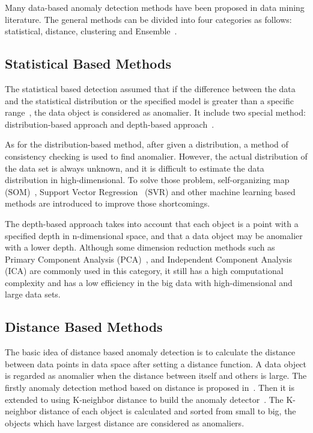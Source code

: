 Many data-based anomaly detection methods have been proposed in
data mining literature.
The general methods can be divided into four categories as follows:
statistical,
distance,
clustering and Ensemble~\cite{cook2019anomaly}.

\subsection{Statistical Based Methods}

The statistical based detection assumed that
if the difference between the data and the statistical
distribution or the specified model
is greater than a specific range~\cite{chandola2009anomaly},
the data object is considered as anomalier.
It include two special method:
distribution-based approach and
depth-based approach~\cite{wu2016survey}.

As for the distribution-based method,
after given a distribution,
a method of consistency checking is used to find anomalier.
However,
the actual distribution of the data set is always unknown,
and it is difficult to estimate the data distribution in high-dimensional.
To solve those problem,
self-organizing map (SOM)~\cite{siripanadorn2010anomaly},
Support Vector Regression~\cite{kromanis2013support} (SVR) and
other machine learning based methods are introduced to
improve those shortcomings.

The depth-based approach takes into account
that each object is a point with
a specified depth in n-dimensional space,
and that a data object may be anomalier with a lower depth.
Although some dimension reduction methods such as
Primary Component Analysis (PCA)~\cite{deng2013modified},
and Independent Component Analysis (ICA)
are commonly used in this category,
it still has a high computational complexity and
has a low efficiency in the big data with
high-dimensional and large data sets.

\subsection{Distance Based Methods}

The basic idea of distance based anomaly detection
is to calculate the distance between data points in
data space after setting a distance function.
A data object is regarded as anomalier when
the distance between  itself and others is large.
The firstly anomaly detection method
based on distance is proposed in~\cite{knorr1997unified}.
Then it is extended to using K-neighbor distance to
build the anomaly detector~\cite{ramaswamy2000efficient,kuang2008anomaly}.
The K-neighbor distance of each object is calculated and
sorted from small to big,
the objects which have largest
distance are considered as anomaliers.

